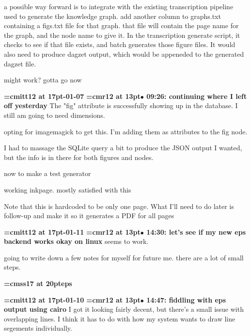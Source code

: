a possible way forward is to integrate with the existing transcription pipeline used to generate the knowledge graph. add another column to graphs.txt containing a figs.txt file for that graph. that file will contain the page name for the graph, and the node name to give it. In the transcription generate script, it checks to see if that file exists, and batch generates those figure files. It would also need to produce dagzet output, which would be appeneded to the generated dagzet file.
\par

might work? gotta go now
\par

{\medskip\noindent\bf\font\titlefont=cmitt12 at 17pt-01-07}\medskip
{\smallskip\noindent\bf\font\titlefont=cmr12 at 13pt\titlefont $\bullet$ 09:26: continuing where I left off yesterday}\smallskip
The "fig" attribute is successfully showing up in the database. I still am going to need dimensions.
\par

opting for imagemagick to get this. I'm adding them as attributes to the fig node.
\par

I had to massage the SQLite query a bit to produce the JSON output I wanted, but the info is in there for both figures and nodes.
\par

now to make a test generator
\par

working inkpage. mostly satisfied with this
\par

Note that this is hardcoded to be only one page. What I'll need to do later is follow-up and make it so it generates a PDF for all pages
\par

{\medskip\noindent\bf\font\titlefont=cmitt12 at 17pt-01-11}\medskip
{\smallskip\noindent\bf\font\titlefont=cmr12 at 13pt\titlefont $\bullet$ 14:30: let's see if my new eps backend works okay on linux}\smallskip
seems to work.
\par

going to write down a few notes for myself for future me. there are a lot of small steps.
\par

{\medskip\noindent\bf\font\titlefont=cmss17 at 20pt\titlefont eps}\medskip

{\medskip\noindent\bf\font\titlefont=cmitt12 at 17pt-01-10}\medskip
{\smallskip\noindent\bf\font\titlefont=cmr12 at 13pt\titlefont $\bullet$ 14:47: fiddling with eps output using cairo}\smallskip
I got it looking fairly decent, but there's a small issue with overlapping lines. I think it has to do with how my system wants to draw line segements individually.
\par

